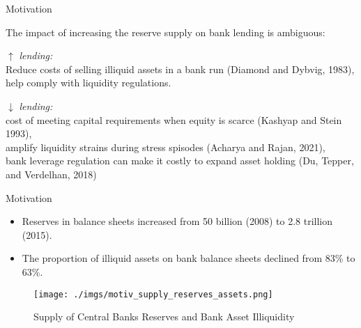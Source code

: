 \documentclass[notes,11pt, aspectratio=169]{beamer}
\newenvironment{wideitemize}{\itemize\addtolength{\itemsep}{10pt}}{\enditemize}
\begin{document}
\begin{frame}{Motivation}

    \begin{wideitemize}
    \item The impact of increasing the reserve supply on bank lending is ambiguous: 
    \vspace{0.15cm}
    \begin{wideitemize}
        \item[$\uparrow$] \textit{lending:} \\Reduce costs of selling illiquid assets in a bank run (Diamond and Dybvig, 1983), \\
         help comply with liquidity regulations.  
        \item[$\downarrow$] \textit{lending:} \\ cost of meeting capital requirements when equity is scarce (Kashyap and Stein 1993),  \\
        amplify liquidity strains during stress spisodes (Acharya and Rajan, 2021),\\
        bank leverage regulation can make it costly to expand asset holding (Du, Tepper, and Verdelhan, 2018)    
    \end{wideitemize}
    
    \end{wideitemize}
    
    \end{frame}
    

\begin{frame}{Motivation}
    \vspace{0.5cm}
      \begin{itemize}
        \item  Reserves in balance sheets increased from 50 billion (2008) to 2.8 trillion (2015).
        \item The proportion of illiquid assets on bank balance sheets declined from 83\% to 63\%.
      \end{itemize}
      
        \begin{figure}[t*]
          \centering
    
          \texttt{[image: ./imgs/motiv\_supply\_reserves\_assets.png]}
        \caption{Supply of Central Banks Reserves and Bank Asset Illiquidity}
        \end{figure}
        
      \end{frame}
    
\end{document}
